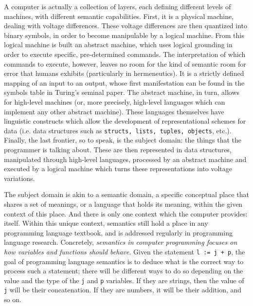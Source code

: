 A computer is actually a collection of layers, each defining different levels of machines, with different semantic capabilities. First, it is a physical machine, dealing with voltage differences. These voltage differences are then quantized into binary symbols, in order to become manipulable by a logical machine. From this logical machine is built an abstract machine, which uses logical grounding in order to execute specific, pre-determined commands. The interpretation of which commands to execute, however, leaves no room for the kind of semantic room for error that humans exhibits (particularly in hermeneutics). It is a strictly defined mapping of an input to an output, whose first manifestation can be found in the symbols table in Turing's seminal paper. The abstract machine, in turn, allows for high-level machines (or, more precisely, high-level languages which can implement any other abstract machine). These languages themselves have linguistic constructs which allow the development of representational schemes for data (i.e. data structures such as \lstinline{structs, lists, tuples, objects}, etc.). Finally, the last frontier, so to speak, is the subject domain: the things that the programmer is talking about. These are then represented in data structures, manipulated through high-level languages, processed by an abstract machine and executed by a logical machine which turns these representations into voltage variations.

The subject domain is akin to a semantic domain, a specific conceptual place that shares a set of meanings, or a language that holds its meaning, within the given context of this place. And there is only one context which the computer provides: itself. Within this unique context, semantics still hold a place in any programming language textbook, and is addressed regularly in programming language research. Concretely, \emph{semantics in computer programming focuses on how variables and functions should behave}\citep{sethi_programming_1996}. Given the statement \lstinline{l := j + p}, the goal of programming language semantics is to deduce what is the correct way to process such a statement; there will be different ways to do so depending on the value and the type of the \lstinline{j} and \lstinline{p} variables. If they are strings, then the value of \lstinline{j} will be their concatenation. If they are numbers, it will be their addition, and so on.


